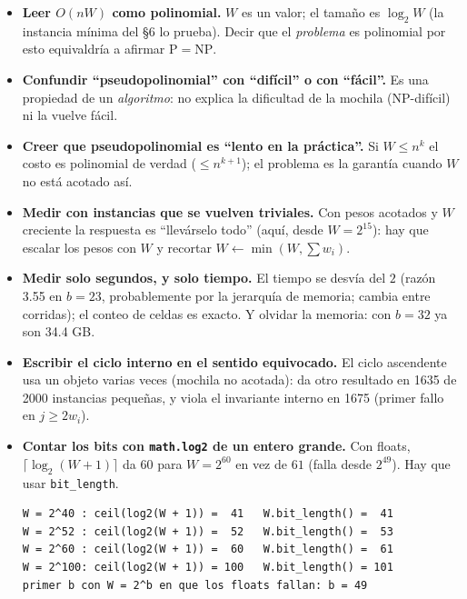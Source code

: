 \documentclass[11pt]{article}
\begin{document}
\begin{alertarota}
\begin{itemize}[leftmargin=14pt]
\item \textbf{Leer $O(nW)$ como polinomial.} $W$ es un valor; el tamaño es $\log_2W$ (la instancia mínima del
§6 lo prueba). Decir que el \emph{problema} es polinomial por esto equivaldría a afirmar
$\mathrm{P}=\mathrm{NP}$.
\item \textbf{Confundir ``pseudopolinomial'' con ``difícil'' o con ``fácil''.} Es una propiedad de un
\emph{algoritmo}: no explica la dificultad de la mochila (NP-difícil) ni la vuelve fácil.
\item \textbf{Creer que pseudopolinomial es ``lento en la práctica''.} Si $W\le n^k$ el costo es polinomial
de verdad ($\le n^{k+1}$); el problema es la garantía cuando $W$ no está acotado así.
\item \textbf{Medir con instancias que se vuelven triviales.} Con pesos acotados y $W$ creciente la respuesta
es ``llevárselo todo'' (aquí, desde $W=2^{15}$): hay que escalar los pesos con $W$ y recortar
$W\leftarrow\min(W,\sum w_i)$.
\item \textbf{Medir solo segundos, y solo tiempo.} El tiempo se desvía del $2$ (razón 3.55 en $b=23$,
probablemente por la jerarquía de memoria; cambia entre corridas); el conteo de celdas es exacto. Y olvidar la memoria: con $b=32$ ya son 34.4 GB.
\item \textbf{Escribir el ciclo interno en el sentido equivocado.} El ciclo ascendente usa un objeto varias veces
(mochila no acotada): da otro resultado en 1635 de 2000 instancias pequeñas, y viola el invariante interno en
1675 (primer fallo en $j\ge2w_i$).
\item \textbf{Contar los bits con \texttt{math.log2} de un entero grande.} Con floats,
$\lceil\log_2(W+1)\rceil$ da $60$ para $W=2^{60}$ en vez de $61$ (falla desde $2^{49}$). Hay que usar
\texttt{bit\_length}.
\begin{lstlisting}[style=salida,basicstyle=\ttfamily\footnotesize\color{black},columns=fixed]
W = 2^40 : ceil(log2(W + 1)) =  41   W.bit_length() =  41
W = 2^52 : ceil(log2(W + 1)) =  52   W.bit_length() =  53
W = 2^60 : ceil(log2(W + 1)) =  60   W.bit_length() =  61
W = 2^100: ceil(log2(W + 1)) = 100   W.bit_length() = 101
primer b con W = 2^b en que los floats fallan: b = 49
\end{lstlisting}
\end{itemize}
\end{alertarota}
\end{document}

